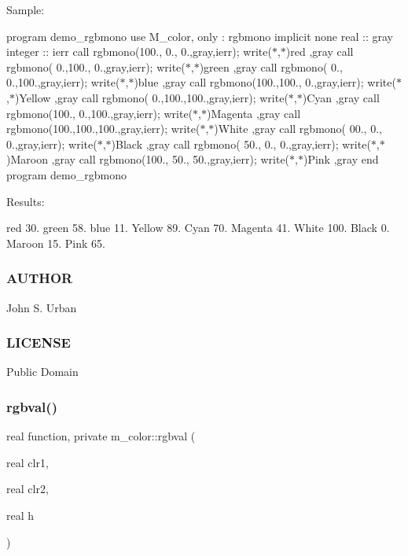 Sample\+:

program demo\+\_\+rgbmono use M\+\_\+color, only \+: rgbmono implicit none real \+:\+: gray integer \+:\+: ierr call rgbmono(100., 0., 0.,gray,ierr); write($\ast$,$\ast$)\textquotesingle{}red \textquotesingle{},gray call rgbmono( 0.,100., 0.,gray,ierr); write($\ast$,$\ast$)\textquotesingle{}green \textquotesingle{},gray call rgbmono( 0., 0.,100.,gray,ierr); write($\ast$,$\ast$)\textquotesingle{}blue \textquotesingle{},gray call rgbmono(100.,100., 0.,gray,ierr); write($\ast$,$\ast$)\textquotesingle{}Yellow \textquotesingle{},gray call rgbmono( 0.,100.,100.,gray,ierr); write($\ast$,$\ast$)\textquotesingle{}Cyan \textquotesingle{},gray call rgbmono(100., 0.,100.,gray,ierr); write($\ast$,$\ast$)\textquotesingle{}Magenta \textquotesingle{},gray call rgbmono(100.,100.,100.,gray,ierr); write($\ast$,$\ast$)\textquotesingle{}White \textquotesingle{},gray call rgbmono( 00., 0., 0.,gray,ierr); write($\ast$,$\ast$)\textquotesingle{}Black \textquotesingle{},gray call rgbmono( 50., 0., 0.,gray,ierr); write($\ast$,$\ast$)\textquotesingle{}Maroon \textquotesingle{},gray call rgbmono(100., 50., 50.,gray,ierr); write($\ast$,$\ast$)\textquotesingle{}Pink \textquotesingle{},gray end program demo\+\_\+rgbmono

Results\+:

red 30. green 58. blue 11. Yellow 89. Cyan 70. Magenta 41. White 100. Black 0. Maroon 15. Pink 65.

\subsubsection*{A\+U\+T\+H\+OR}

John S. Urban

\subsubsection*{L\+I\+C\+E\+N\+SE}

Public Domain \mbox{\label{namespacem__color_a3e97e24dba7b820f685f13eaa64a6caa}} 
\subsubsection{\texorpdfstring{rgbval()}{rgbval()}}
{\footnotesize\ttfamily real function, private m\+\_\+color\+::rgbval (\begin{DoxyParamCaption}\item[{real}]{clr1,  }\item[{real}]{clr2,  }\item[{real}]{h }\end{DoxyParamCaption})\hspace{0.3cm}{\ttfamily [private]}}


